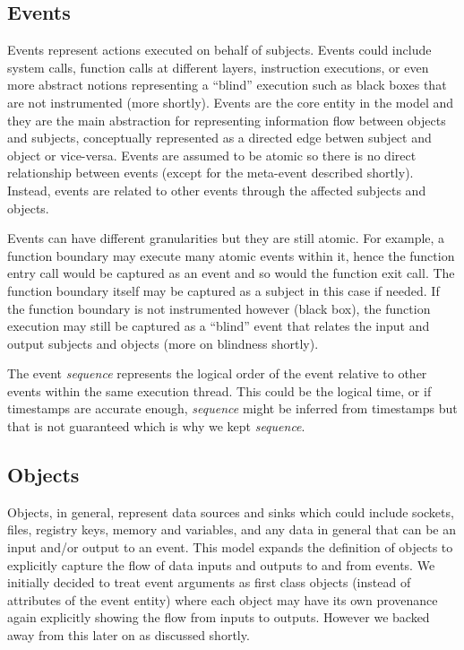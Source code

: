 \documentclass[10pt, conference, onecolumn]{IEEEtran}
\begin{document}
\subsection{Events}\label{sec:conceptual:events}

Events represent actions executed on behalf of subjects. Events could
include system calls, function calls at different layers, instruction
executions, or even more abstract notions representing a ``blind''
execution such as black boxes that are not instrumented (more
shortly). Events are the core entity in the model and they are the
main abstraction for representing information flow between objects and
subjects, conceptually represented as a directed edge betwen subject
and object or vice-versa.  Events are assumed to be atomic so there is
no direct relationship between events (except for the meta-event
described shortly). Instead, events are related to other events
through the affected subjects and objects.

Events can have different granularities but they are still atomic. For
example, a function boundary may execute many atomic events within it,
hence the function entry call would be captured as an event and so
would the function exit call. The function boundary itself may be
captured as a subject in this case if needed. If the function boundary
is not instrumented however (black box), the function execution may
still be captured as a ``blind'' event that relates the input and
output subjects and objects (more on blindness shortly).

The event \textit{sequence} represents the logical order of the event
relative to other events within the same execution thread.  This could
be the logical time, or if timestamps are accurate enough,
\textit{sequence} might be inferred from timestamps but that is not
guaranteed which is why we kept \textit{sequence}.

\subsection{Objects}\label{sec:objects}

Objects, in general, represent data sources and sinks which could
include sockets, files, registry keys, memory and variables, and any
data in general that can be an input and/or output to an event. This
model expands the definition of objects to explicitly capture the flow
of data inputs and outputs to and from events.  We initially decided
to treat event arguments as first class objects (instead of attributes
of the event entity) where each object may have its own provenance
again explicitly showing the flow from inputs to outputs. However we
backed away from this later on as discussed shortly.
\end{document}
